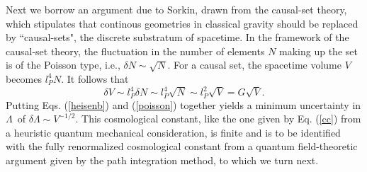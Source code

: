 \documentclass[a4paper]{jpconf}
\begin{document}
Next we borrow an argument due to Sorkin\cite{sorkin},
drawn from the causal-set theory, which
stipulates that continous geometries in classical gravity should be
replaced by ``causal-sets", the discrete substratum of spacetime.
In the framework of the causal-set theory, the
fluctuation in the number of elements $N$ making up the set is of the
Poisson type, i.e., $\delta N \sim \sqrt{N}$.  For a causal set, the
spacetime volume $V$ becomes $l_P^4 N$.  It follows that
\begin{equation}
\delta V \sim l_P^4\delta N \sim l_P^4 \sqrt{N}
\sim l_P^2\sqrt{V} = G \sqrt{V}.
\label{poisson}
\end{equation}
Putting Eqs. (\ref{heisenb}) and (\ref{poisson}) together yields a minimum
uncertainty in
$\Lambda$\ of $\delta \Lambda \sim V^{-1/2}$. This cosmological constant,
like the one given by Eq. (\ref{cc}) from a heuristic quantum mechanical
consideration, is finite and is to be identified with the fully 
renormalized cosmological constant from a quantum field-theoretic
argument given by the path integration method, to which we turn next.\\
\end{document}
